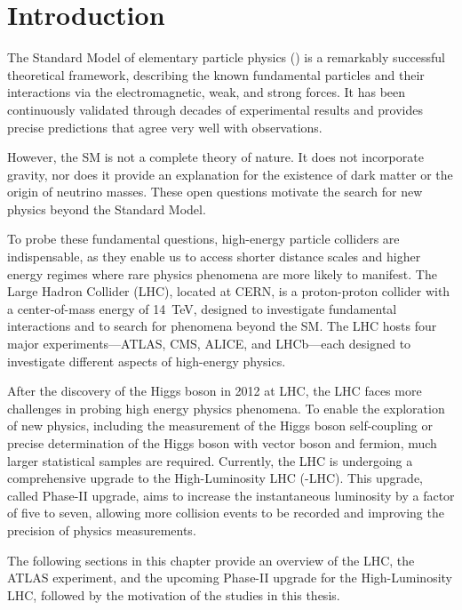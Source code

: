 \chapter{Introduction} \label{ch:introduction}
The Standard Model of elementary particle physics (\SM) is a remarkably successful theoretical framework, describing the known fundamental particles and their interactions via the electromagnetic, weak, and strong forces. It has been continuously validated through decades of experimental results and provides precise predictions that agree very well with observations.

However, the SM is not a complete theory of nature. It does not incorporate gravity, nor does it provide an explanation for the existence of dark matter or the origin of neutrino masses. These open questions motivate the search for new physics beyond the Standard Model.

To probe these fundamental questions, high-energy particle colliders are indispensable, as they enable us to access shorter distance scales and higher energy regimes where rare physics phenomena are more likely to manifest. The Large Hadron Collider (LHC), located at CERN, is a proton-proton collider with a center-of-mass energy of 14~TeV, designed to investigate fundamental interactions and to search for phenomena beyond the SM. The LHC hosts four major experiments—ATLAS, CMS, ALICE, and LHCb—each designed to investigate different aspects of high-energy physics.

After the discovery of the Higgs boson in 2012 at LHC, the LHC faces more challenges in probing high energy physics phenomena. To enable the exploration of new physics, including the measurement of the Higgs boson self-coupling or precise determination of the Higgs boson with vector boson and fermion, much larger statistical samples are required. Currently, the LHC is undergoing a comprehensive upgrade to the High-Luminosity LHC (\HL-LHC). This upgrade, called Phase-II upgrade, aims to increase the instantaneous luminosity by a factor of five to seven, allowing more collision events to be recorded and improving the precision of physics measurements.

The following sections in this chapter provide an overview of the LHC, the ATLAS experiment, and the upcoming Phase-II upgrade for the High-Luminosity LHC, followed by the motivation of the studies in this thesis.

